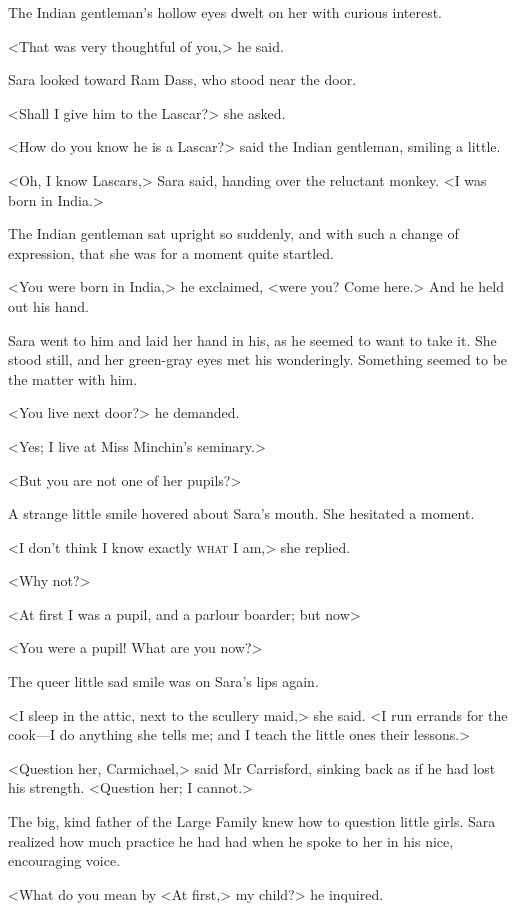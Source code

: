 The Indian gentleman's hollow eyes dwelt on her with curious interest.

<That was very thoughtful of you,> he said.

Sara looked toward Ram Dass, who stood near the door.

<Shall I give him to the Lascar?> she asked.

<How do you know he is a Lascar?> said the Indian gentleman, smiling a little.

<Oh, I know Lascars,> Sara said, handing over the reluctant monkey. <I was born in India.>

The Indian gentleman sat upright so suddenly, and with such a change of expression, that she was for a moment quite startled.

<You were born in India,> he exclaimed, <were you? Come here.> And he held out his hand.

Sara went to him and laid her hand in his, as he seemed to want to take it. She stood still, and her green-gray eyes met his wonderingly. Something seemed to be the matter with him.

<You live next door?> he demanded.

<Yes; I live at Miss Minchin's seminary.>

<But you are not one of her pupils?>

A strange little smile hovered about Sara's mouth. She hesitated a moment.

<I don't think I know exactly \textsc{what} I am,> she replied.

<Why not?>

<At first I was a pupil, and a parlour boarder; but now\longdash>

<You were a pupil! What are you now?>

The queer little sad smile was on Sara's lips again.

<I sleep in the attic, next to the scullery maid,> she said. <I run errands for the cook—I do anything she tells me; and I teach the little ones their lessons.>

<Question her, Carmichael,> said Mr Carrisford, sinking back as if he had lost his strength. <Question her; I cannot.>

The big, kind father of the Large Family knew how to question little girls. Sara realized how much practice he had had when he spoke to her in his nice, encouraging voice.

<What do you mean by <At first,> my child?> he inquired.

